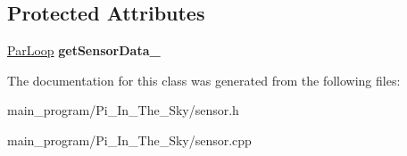\subsection*{Protected Attributes}
\begin{DoxyCompactItemize}
\item 
\hyperlink{class_par_loop}{Par\+Loop} {\bfseries get\+Sensor\+Data\+\_\+}\hypertarget{class_sensor_a521d9c28b9880014e6b9c7b039ac0e11}{}\label{class_sensor_a521d9c28b9880014e6b9c7b039ac0e11}

\end{DoxyCompactItemize}


The documentation for this class was generated from the following files\+:\begin{DoxyCompactItemize}
\item 
main\+\_\+program/\+Pi\+\_\+\+In\+\_\+\+The\+\_\+\+Sky/sensor.\+h\item 
main\+\_\+program/\+Pi\+\_\+\+In\+\_\+\+The\+\_\+\+Sky/sensor.\+cpp\end{DoxyCompactItemize}
